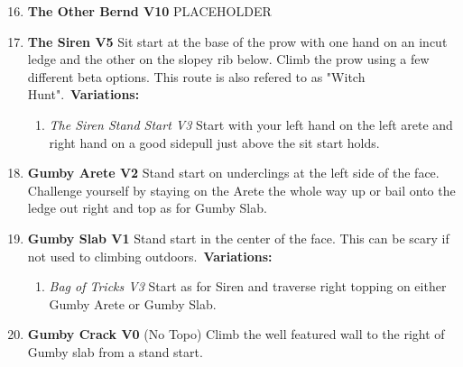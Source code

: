 \begin{enumerate}[]
	\setcounter{enumi}{15}
	\item\label{rt:The Other Bernd} \colorbox{red!20}{\textbf{The Other Bernd V10  } }
	\newline PLACEHOLDER\
	\setcounter{enumi}{16}
	\item\label{rt:The Siren} \colorbox{RoyalBlue!20}{\textbf{The Siren V5     } }
	\newline Sit start at the base of the prow with one hand on an incut ledge and the other on the slopey rib below. Climb the prow using a few different beta options. This route is also refered to as "Witch Hunt".\
	\newline \textbf{Variations:}
	\begin{enumerate}
		\item\label{vr:The Siren Stand Start} \colorbox{green!20}{\emph{The Siren Stand Start V3    }  }
		\newline Start with your left hand on the left arete and right hand on a good sidepull just above the sit start holds.\
	\end{enumerate}
	\setcounter{enumi}{17}
	\item\label{rt:Gumby Arete} \colorbox{green!20}{\textbf{Gumby Arete V2 \ding{72} \ding{72}  } }
	\newline Stand start on underclings at the left side of the face. Challenge yourself by staying on the Arete the whole way up or bail onto the ledge out right and top as for Gumby Slab.\
	\setcounter{enumi}{18}
	\item\label{rt:Gumby Slab} \colorbox{green!20}{\textbf{Gumby Slab V1     } }
	\newline Stand start in the center of the face. This can be scary if not used to climbing outdoors.\
	\newline \textbf{Variations:}
	\begin{enumerate}
		\item\label{vr:Bag of Tricks} \colorbox{green!20}{\emph{Bag of Tricks V3   }  }
		\newline Start as for Siren and traverse right topping on either Gumby Arete or Gumby Slab.\
	\end{enumerate}
	\setcounter{enumi}{19}
	\item\label{rt:Gumby Crack} \colorbox{green!20}{\textbf{Gumby Crack V0    } }
	\newline (No Topo) 
	\newline Climb the well featured wall to the right of Gumby slab from a stand start.\
\end{enumerate}
